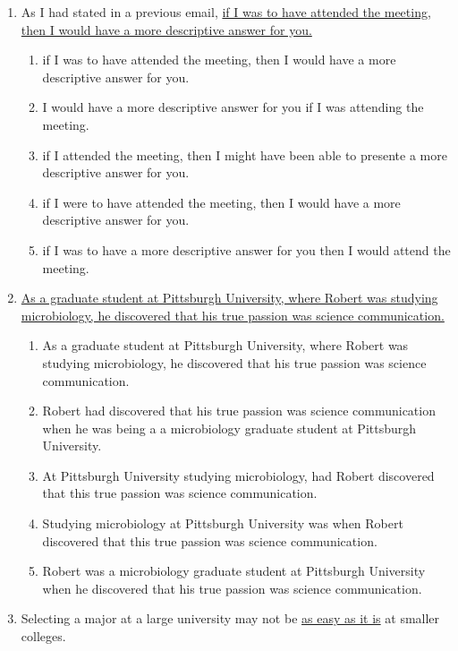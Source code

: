 \begin{enumerate}[resume]
\bigskip
\item As I had stated in a previous email, \ul{if I was to have attended the meeting, then I would have a more descriptive answer for you.}

\begin{enumerate}[label=(\Alph*)]
\item if I was to have attended the meeting, then I would have a more descriptive answer for you.
\item I would have a more descriptive answer for you if I was attending the meeting.
\item if I attended the meeting, then I might have been able to presente a more descriptive answer for you. 
\item if I were to have attended the meeting, then I would have a more descriptive answer for you. 
\item  if I was to have a more descriptive answer for you then I would attend the meeting. 
\end{enumerate}

\newpage
\item \ul{As a graduate student at Pittsburgh University, where Robert was studying microbiology, he discovered that his true passion was science communication.}

\begin{enumerate}[label=(\Alph*)]
\item As a graduate student at Pittsburgh University, where Robert was studying microbiology, he discovered that his true passion was science communication.
\item Robert had discovered that his true passion was science communication when he was being a a microbiology graduate student at Pittsburgh University.
\item At Pittsburgh University studying microbiology, had Robert discovered that this true passion was science communication. 
\item Studying microbiology at Pittsburgh University was when Robert discovered that this true passion was science communication. 
\item Robert was a microbiology graduate student at Pittsburgh University when he discovered that his true passion was science communication.
\end{enumerate}

\bigskip
\item Selecting a major at a large university may not be \ul{as easy as it is} at smaller colleges. 


\end{enumerate}
